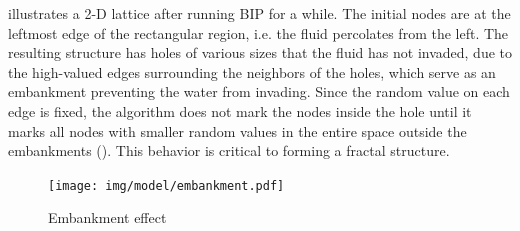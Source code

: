  illustrates a 2-D lattice after running BIP for a while. The initial nodes are 
at the leftmost edge of the rectangular region, i.e. the fluid percolates from the left. The
resulting structure has holes of various sizes that the fluid has not invaded, due to
the high-valued edges surrounding the neighbors of the holes, which serve as an embankment preventing the water from invading. Since the random value
on each edge is fixed, the algorithm does not mark the nodes inside the hole until it marks all nodes with smaller
random values in the entire space outside the embankments ().
This behavior is critical to forming a fractal structure.

\begin{figure}[tb]
 \centering
 \texttt{[image: img/model/embankment.pdf]}
 \caption{Embankment effect}
 \label{fig:embankment}
\end{figure}
